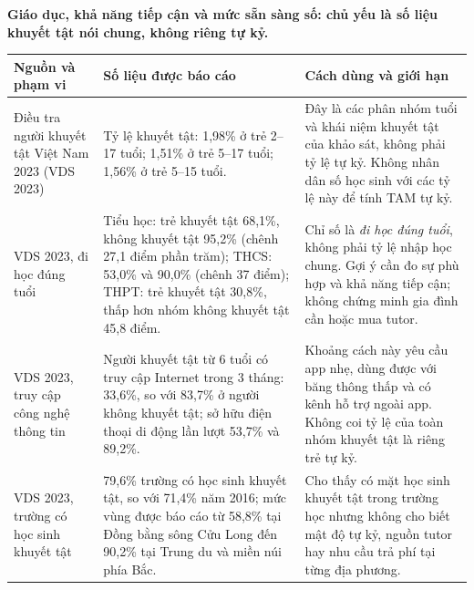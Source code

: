 \documentclass[11pt,a4paper]{article}
\begin{document}
\vspace{5pt}
\textbf{Giáo dục, khả năng tiếp cận và mức sẵn sàng số: chủ yếu là số liệu
khuyết tật nói chung, không riêng tự kỷ.}\par\smallskip\noindent
\begin{tabularx}{\textwidth}{p{3.15cm}p{5.25cm}Y}
\toprule
\textbf{Nguồn và phạm vi} & \textbf{Số liệu được báo cáo} &
\textbf{Cách dùng và giới hạn} \\
\midrule
Điều tra người khuyết tật Việt Nam 2023 (VDS 2023) \cite{gso2023} &
Tỷ lệ khuyết tật: 1,98\% ở trẻ 2--17 tuổi; 1,51\% ở trẻ 5--17 tuổi; 1,56\%
ở trẻ 5--15 tuổi. &
Đây là các phân nhóm tuổi và khái niệm khuyết tật của khảo sát, không phải
tỷ lệ tự kỷ. Không nhân dân số học sinh với các tỷ lệ này để tính TAM tự kỷ. \\
\addlinespace
VDS 2023, đi học đúng tuổi \cite{gso2023} &
Tiểu học: trẻ khuyết tật 68,1\%, không khuyết tật 95,2\% (chênh 27,1 điểm
phần trăm); THCS: 53,0\% và 90,0\% (chênh 37 điểm); THPT: trẻ khuyết tật
30,8\%, thấp hơn nhóm không khuyết tật 45,8 điểm. &
Chỉ số là \emph{đi học đúng tuổi}, không phải tỷ lệ nhập học chung. Gợi ý cần
đo sự phù hợp và khả năng tiếp cận; không chứng minh gia đình cần hoặc mua tutor. \\
\addlinespace
VDS 2023, truy cập công nghệ thông tin \cite{gso2023} &
Người khuyết tật từ 6 tuổi có truy cập Internet trong 3 tháng: 33,6\%, so
với 83,7\% ở người không khuyết tật; sở hữu điện thoại di động lần lượt
53,7\% và 89,2\%. &
Khoảng cách này yêu cầu app nhẹ, dùng được với băng thông thấp và có kênh
hỗ trợ ngoài app. Không coi tỷ lệ của toàn nhóm khuyết tật là riêng trẻ tự kỷ. \\
\addlinespace
VDS 2023, trường có học sinh khuyết tật \cite{gso2023} &
79,6\% trường có học sinh khuyết tật, so với 71,4\% năm 2016; mức vùng
được báo cáo từ 58,8\% tại Đồng bằng sông Cửu Long đến 90,2\% tại Trung du
và miền núi phía Bắc. &
Cho thấy có mặt học sinh khuyết tật trong trường học nhưng không cho biết
mật độ tự kỷ, nguồn tutor hay nhu cầu trả phí tại từng địa phương. \\
\bottomrule
\end{tabularx}
\end{document}

